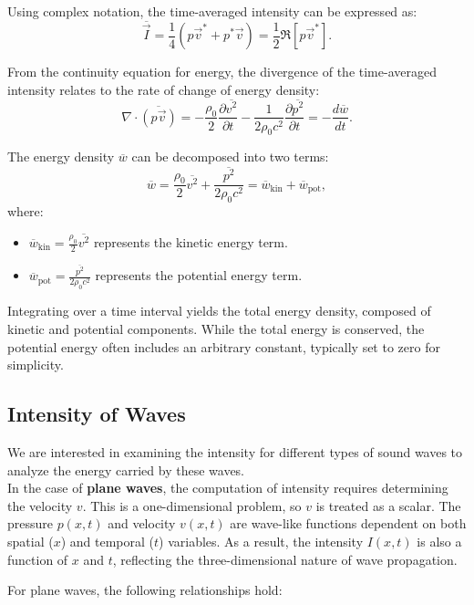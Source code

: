 \documentclass[a4paper]{article}
\begin{document}
Using complex notation, the time-averaged intensity can be expressed as:
\[
\overline{\vec{I}} = \frac{1}{4} (p \vec{v}^* + p^* \vec{v}) = \frac{1}{2} \Re[p \vec{v}^*].
\]

From the continuity equation for energy, the divergence of the time-averaged intensity relates to the rate of change of energy density:
\[
\nabla \cdot \overline{(p \vec{v})} = - \frac{\rho_0}{2} \frac{\partial \overline{v^2}}{\partial t} - \frac{1}{2 \rho_0 c^2} \frac{\partial \overline{p^2}}{\partial t} = -\frac{d\overline{w}}{dt}.
\]

The energy density \(\overline{w}\) can be decomposed into two terms:
\[
\overline{w} = \frac{\rho_0}{2} \overline{v^2} + \frac{\overline{p^2}}{2 \rho_0 c^2} = \overline{w}_{\text{kin}} + \overline{w}_{\text{pot}},
\]
where:
\begin{itemize}
    \item \(\overline{w}_{\text{kin}} = \frac{\rho_0}{2} \overline{v^2}\) represents the kinetic energy term.
    \item \(\overline{w}_{\text{pot}} = \frac{\overline{p^2}}{2 \rho_0 c^2}\) represents the potential energy term.
\end{itemize}


Integrating over a time interval yields the total energy density, composed of kinetic and potential components. While the total energy is conserved, the potential energy often includes an arbitrary constant, typically set to zero for simplicity.

\subsection{Intensity of Waves}



We are interested in examining the intensity for different types of sound waves to analyze the energy carried by these waves.\\

In the case of \textbf{plane waves}, the computation of intensity requires determining the velocity \( v \). This is a one-dimensional problem, so \( v \) is treated as a scalar. The pressure \( p(x, t) \) and velocity \( v(x, t) \) are wave-like functions dependent on both spatial (\( x \)) and temporal (\( t \)) variables. As a result, the intensity \( I(x, t) \) is also a function of \( x \) and \( t \), reflecting the three-dimensional nature of wave propagation.

For plane waves, the following relationships hold:
\end{document}
